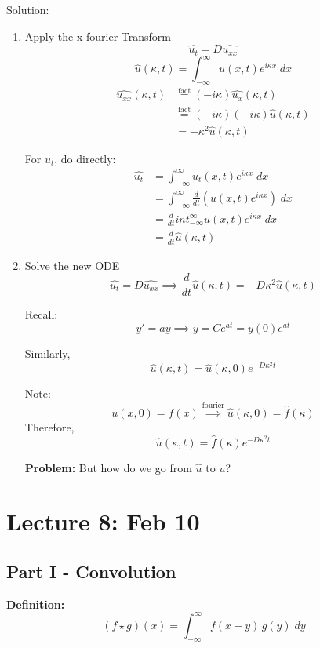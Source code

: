 \documentclass[12pt]{article}
\newcommand{\ans}[1]{\boxed{\text{#1}}}
\renewcommand{\hat}[1]{\widehat{#1}}
\begin{document}
Solution:
\begin{enumerate}
    \item Apply the x fourier Transform
    \[\hat{u_t} = D \hat{u_{xx}}\]
    \[\hat{u}(\kappa, t) = \int_{-\infty}^\infty u(x, t)e^{i\kappa x}\; dx\]
    \begin{align*}
        \widehat{u_{xx}}(\kappa, t) &\overset{\text{fact}}{=} (-i\kappa) \hat{u_x}(\kappa, t)\\
        &\overset{\text{fact}}{=} (-i\kappa)(-i\kappa) \hat{u}(\kappa, t)\\
        &= -\kappa^2 \hat{u}(\kappa, t)
    \end{align*}

    For $u_t$, do directly:
    \begin{align*}
        \hat{u_t} &= \int_{-\infty}^\infty u_t(x, t) e^{i\kappa x} \; dx \\
        &= \int_{-\infty}^\infty \frac{d}{dt}(u(x, t)e^{i\kappa x}) \; dx\\
        &= \frac{d}{dt}int_{-\infty}^\infty u(x, t)e^{i\kappa x} \; dx\\
        &= \frac{d}{dt} \hat{u}(\kappa, t)
    \end{align*}

    \item Solve the new ODE 
    \[\hat{u_t} = D\hat{u_{xx}} \implies \frac{d}{dt}\hat{u}(\kappa, t) = -D\kappa^2 \hat{u}(\kappa, t)\]
    
    Recall:
    \[y' = ay \implies y= Ce^{at} = y(0)e^{at}\]

    Similarly, 
    \[\hat{u}(\kappa, t) = \hat{u}(\kappa, 0)e^{-D\kappa^2t} \]

    Note: 
    \[u(x, 0) = f(x) \overset{\text{fourier}}{\implies} \hat{u}(\kappa, 0) = \hat{f}(\kappa)\]
    Therefore, 
    \[\ans{$\hat{u}(\kappa, t) = \hat{f}(\kappa)e^{-D\kappa^2t}$}\]

    \textbf{Problem:} But how do we go from $\hat{u}$ to $u$?
\end{enumerate}

\section{Lecture 8: Feb 10}
\subsection*{Part I - Convolution}
\textbf{Definition:}
\[(f \star g)(x) = \int_{-\infty}^\infty f(x - y)\, g(y)\; dy\]
\end{document}
